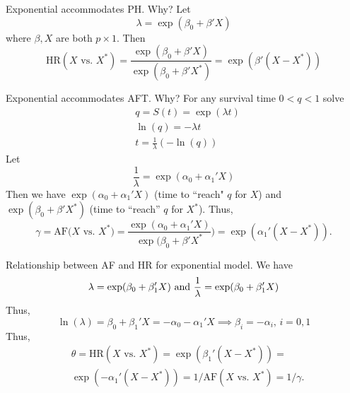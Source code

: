\documentclass{article}
\begin{document}
 Exponential accommodates PH. Why? Let
\[
\lambda=\exp(\beta_0 + \beta' X)
\] where $\beta, X$ are both $p \times 1$.
Then
\[
\text{HR}(X \text{ vs. } X^*)  = \dfrac{\exp(\beta_0 + \beta' X)}{\exp(\beta_0 + \beta' X^*)} = \exp(\beta'(X - X^*))
\]

 Exponential accommodates AFT. Why? For any survival time $0 < q < 1$ solve
\begin{align*}
& q = S(t) = \exp(\lambda t) \\
& \ln(q) = - \lambda t \\
& t = \frac{1}{\lambda} (- \ln(q))
\end{align*}
Let
\[
\frac{1}{\lambda} = \exp(\alpha_0 + \alpha_1'X)
\]
Then we have $\exp(\alpha_0 + \alpha_1'X)$ (time to ``reach" $q$ for $X$) and \\ $\exp(\beta_0 + \beta'X^*)$ (time to ``reach'' $q$ for $X^*$). Thus,
\[
\gamma = \text{AF($X$ vs. $X^*$)} = \frac{\exp(\alpha_0 + \alpha_1'X)}{\exp(\beta_0 + \beta'X^*}) = \exp(\alpha_1'(X-X^*)).
\]

 Relationship between AF and HR for exponential model. We have
\[
\lambda = \exp(\beta_0 + \beta_1'X) \text{ and } \frac{1}{\lambda} = \exp(\beta_0 + \beta_1'X) \\
\]
Thus,
\[ \ln(\lambda) = \beta_0 + \beta_1'X = -\alpha_0 - \alpha_1'X \implies \beta_i = -\alpha_i, \, i=0,1 \]
Thus,
\begin{align*}
&\theta = \text{HR}(X \text{ vs. } X^*) = \exp(\beta_1'(X - X^*)) =\\
&\exp(-\alpha_1'(X - X^*)) = 1/\text{AF}(X \text{ vs. } X^*) = 1/\gamma.
\end{align*}
\end{document}
